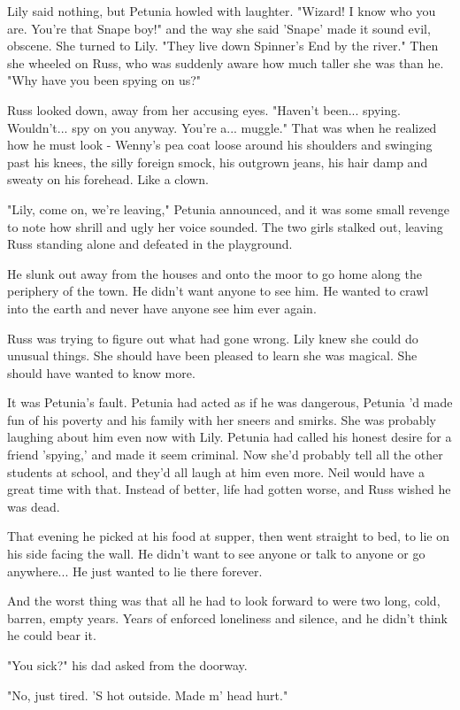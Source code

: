 \documentclass[a4paper,11pt]{article}
\begin{document}
Lily said nothing, but Petunia howled with laughter. "Wizard! I know who you are. You're that Snape boy!" and the way she said 'Snape' made it sound evil, obscene. She turned to Lily. "They live down Spinner's End by the river." Then she wheeled on Russ, who was suddenly aware how much taller she was than he. "Why have you been spying on us?"

Russ looked down, away from her accusing eyes. "Haven't been... spying. Wouldn't... spy on you anyway. You're a... muggle." That was when he realized how he must look - Wenny's pea coat loose around his shoulders and swinging past his knees, the silly foreign smock, his outgrown jeans, his hair damp and sweaty on his forehead. Like a clown.

"Lily, come on, we're leaving," Petunia announced, and it was some small revenge to note how shrill and ugly her voice sounded. The two girls stalked out, leaving Russ standing alone and defeated in the playground.

He slunk out away from the houses and onto the moor to go home along the periphery of the town. He didn't want anyone to see him. He wanted to crawl into the earth and never have anyone see him ever again.

Russ was trying to figure out what had gone wrong. Lily knew she could do unusual things. She should have been pleased to learn she was magical. She should have wanted to know more.

It was Petunia's fault. Petunia had acted as if he was dangerous, Petunia 'd made fun of his poverty and his family with her sneers and smirks. She was probably laughing about him even now with Lily. Petunia had called his honest desire for a friend 'spying,' and made it seem criminal. Now she'd probably tell all the other students at school, and they'd all laugh at him even more. Neil would have a great time with that. Instead of better, life had gotten worse, and Russ wished he was dead.

That evening he picked at his food at supper, then went straight to bed, to lie on his side facing the wall. He didn't want to see anyone or talk to anyone or go anywhere... He just wanted to lie there forever.

And the worst thing was that all he had to look forward to were two long, cold, barren, empty years. Years of enforced loneliness and silence, and he didn't think he could bear it.

"You sick?" his dad asked from the doorway.

"No, just tired. 'S hot outside. Made m' head hurt."
\end{document}
